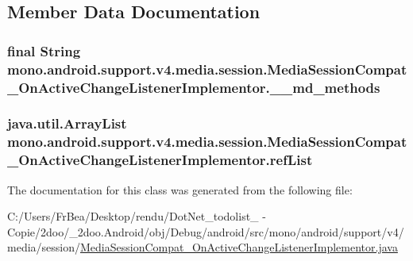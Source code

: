 \subsection{Member Data Documentation}
\hypertarget{classmono_1_1android_1_1support_1_1v4_1_1media_1_1session_1_1_media_session_compat___on_active_change_listener_implementor_7d352c858f06680808244b09f3ed2849}{
\subsubsection[{\_\-\_\-md\_\-methods}]{\setlength{\rightskip}{0pt plus 5cm}final String {\bf mono.android.support.v4.media.session.MediaSessionCompat\_\-OnActiveChangeListenerImplementor.\_\-\_\-md\_\-methods}}}
\label{classmono_1_1android_1_1support_1_1v4_1_1media_1_1session_1_1_media_session_compat___on_active_change_listener_implementor_7d352c858f06680808244b09f3ed2849}


\hypertarget{classmono_1_1android_1_1support_1_1v4_1_1media_1_1session_1_1_media_session_compat___on_active_change_listener_implementor_ac22d676a4da9a5ed6ab94314943f6ca}{
\subsubsection[{refList}]{\setlength{\rightskip}{0pt plus 5cm}java.util.ArrayList {\bf mono.android.support.v4.media.session.MediaSessionCompat\_\-OnActiveChangeListenerImplementor.refList}}}
\label{classmono_1_1android_1_1support_1_1v4_1_1media_1_1session_1_1_media_session_compat___on_active_change_listener_implementor_ac22d676a4da9a5ed6ab94314943f6ca}




The documentation for this class was generated from the following file:\begin{CompactItemize}
\item 
C:/Users/FrBea/Desktop/rendu/DotNet\_\-todolist\_ - Copie/2doo/\_\-2doo.Android/obj/Debug/android/src/mono/android/support/v4/media/session/\hyperlink{_media_session_compat___on_active_change_listener_implementor_8java}{MediaSessionCompat\_\-OnActiveChangeListenerImplementor.java}\end{CompactItemize}
